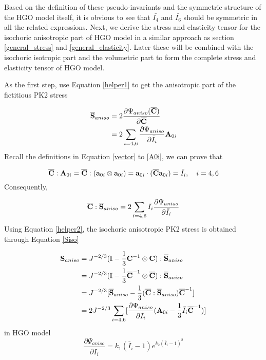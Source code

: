 Based on the definition of these pseudo-invariants and the symmetric structure of the HGO model itself, it is obvious to see that $\bar{I_4}$ and $\bar{I_6}$ should be symmetric in all the related expressions. Next, we derive the stress and elasticity tensor for the isochoric anisotropic part of HGO model in a similar approach as section \ref{general_stress} and \ref{general_elasticity}. Later these will be combined with the isochoric isotropic part and the volumetric part to form the complete stress and elasticity tensor of HGO model.

As the first step, use Equation \ref{helper1} to get the anisotropic part of the fictitious PK2 stress

\begin{equation} \label{Sbar3}
\begin{split}
\overline{\bold{S}}_{aniso} &=  2\frac{\partial\Psi_{aniso}({\overline{\bold{C}})}}{\partial\overline{\bold{C}}} \\
&= 2\sum_{i = 4, 6}\frac{\partial{\Psi_{aniso}}}{\partial{\bar{I}_i}}\bold{A}_{0i} 
\end{split}
\end{equation}
Recall the definitions in Equation \ref{vector} to \ref{A0i}, we can prove that

\begin{equation}
\overline{\bold{C}} : \bold{A}_{0i} = \overline{\bold{C}} : (\bold{a}_{0i} \otimes \bold{a}_{0i}) = \bold{a}_{0i} \cdot (\overline{\bold{C}} \bold{a}_{0i}) = \bar{I}_i, \quad i = 4, 6
\end{equation}
Consequently, 

\begin{equation} \label{helper2}
\overline{\bold{C}} : \overline{\bold{S}}_{aniso} = 2\sum_{i = 4, 6} \bar{I}_i \frac{\partial{\Psi_{aniso}}}{\partial{\bar{I}_i}}  
\end{equation}
Using Equation \ref{helper2}, the isochoric anisotropic PK2 stress is obtained through Equation \ref{Siso}

\begin{equation} \label{Sanisotropic}
\begin{split}
\bold{S}_{aniso} &=J^{-2/3}(\mathbb{I} - \frac{1}{3}{{\bold{C}}}^{-1} \otimes {\bold{C}}) : \overline{\bold{S}}_{aniso}  \\
&= J^{-2/3}(\mathbb{I} - \frac{1}{3}{\overline{\bold{C}}}^{-1} \otimes \overline{\bold{C}}) : \overline{\bold{S}}_{aniso} \\
&= J^{-2/3}[\overline{\bold{S}}_{aniso} - \frac{1}{3}(\overline{\bold{C}} : \overline{\bold{S}}_{aniso}){\overline{\bold{C}}}^{-1}] \\
&= 2J^{-2/3} \sum_{i = 4, 6}[\frac{\partial{\Psi_{aniso}}}{\partial{\bar{I}_i}}  (\bold{A}_{0i} - \frac{1}{3}\bar{I}_i\overline{\bold{C}}^{-1})]
\end{split}
\end{equation}
in HGO model
\begin{equation} \label{HGOderivative1}
\frac{\partial\Psi_{aniso}}{\partial{\bar{I}_i}} = k_1(\bar{I}_i - 1)e^{k_2(\bar{I}_i - 1)^2}
\end{equation}

